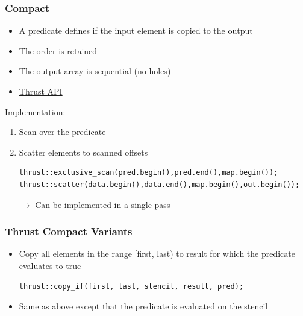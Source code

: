 \documentclass[aspectratio=169]{beamer}
\begin{document}
\begin{frame}[fragile]
\frametitle{Compact}
\begin{itemize}
	\item A predicate defines if the input element is copied to the output
	\item<2-> The order is retained
	\item<2-> The output array is sequential (no holes)
	\item<2-> \href{https://thrust.github.io/doc/group__stream__compaction.html}{Thrust API}
\end{itemize}
Implementation:
\begin{enumerate}
	\item Scan over the predicate
	\item Scatter elements to scanned offsets
\begin{lstlisting}
thrust::exclusive_scan(pred.begin(),pred.end(),map.begin());
thrust::scatter(data.begin(),data.end(),map.begin(),out.begin());
\end{lstlisting}
\item [$\rightarrow$] Can be implemented in a single pass
\end{enumerate}
\end{frame}

\begin{frame}[fragile]
\frametitle{Thrust Compact Variants}

\begin{itemize}
\begin{lstlisting}
thrust::copy_if(first, last, result, pred);		
\end{lstlisting}
	\item Copy all elements in the range [first, last) to result for which the predicate evaluates to true
\begin{lstlisting}
thrust::copy_if(first, last, stencil, result, pred);		
\end{lstlisting}
\item Same as above except that the predicate is evaluated on the stencil
\end{itemize}
\end{frame}
\end{document}
